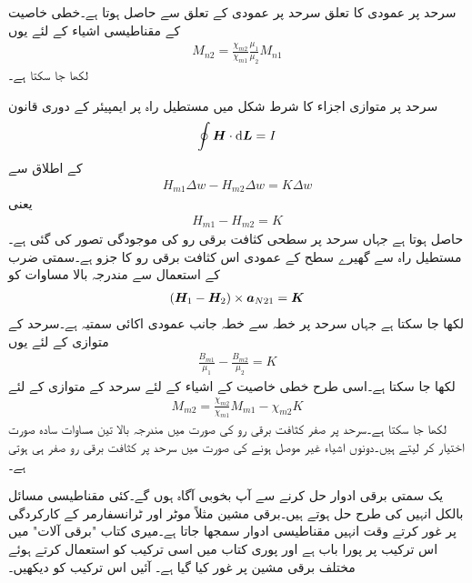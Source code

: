 سرحد پر عمودی  کا تعلق سرحد پر عمودی  کے تعلق سے حاصل ہوتا ہے۔خطی خاصیت کے مقناطیسی اشیاء کے لئے یوں
\begin{align}
M_{n2}=\frac{\chi_{m2}}{\chi_{m1}}\frac{\mu_1}{\mu_2}M_{n1}
\end{align}
لکھا جا سکتا ہے۔

سرحد پر متوازی اجزاء کا شرط شکل میں مستطیل راہ پر ایمپیئر کے دوری قانون
\begin{align*}
\oint \kvec{H} \cdot \dif \kvec{L}=I
\end{align*}
کے اطلاق سے
\begin{align*}
H_{m1} \Delta w -H_{m2}\Delta w=K \Delta w
\end{align*}
یعنی
\begin{align}
H_{m1} -H_{m2}=K
\end{align}
 حاصل ہوتا ہے جہاں سرحد پر سطحی کثافت برقی رو  کی موجودگی تصور کی گئی ہے۔مستطیل راہ سے گھیرے سطح کے عمودی اس کثافت برقی رو کا جزو  ہے۔سمتی ضرب کے استعمال سے مندرجہ بالا مساوات کو
\begin{align}
\left({{\boldsymbol{H}}}_1-{{\boldsymbol{H}}}_2 \right) \times {\ensuremath{{\boldsymbol{a}}}}_{N21} ={{\boldsymbol{K}}}
\end{align}
لکھا جا سکتا ہے جہاں  سرحد پر خطہ  سے خطہ  جانب عمودی اکائی سمتیہ  ہے۔سرحد کے متوازی  کے لئے یوں
\begin{align}
\frac{B_{m1}}{\mu_1}-\frac{B_{m2}}{\mu_2}=K
\end{align}
لکھا جا سکتا ہے۔اسی طرح خطی خاصیت کے اشیاء کے لئے سرحد کے متوازی  کے لئے
\begin{align}
M_{m2}=\frac{\chi_{m2}}{\chi_{m1}} M_{m1}-\chi_{m2} K
\end{align}
لکھا جا سکتا ہے۔سرحد پر صفر کثافت برقی رو کی صورت میں مندرجہ بالا تین مساوات سادہ صورت اختیار کر لیتے ہیں۔دونوں اشیاء غیر موصل ہونے کی صورت میں سرحد پر کثافت برقی رو صفر ہی ہوتی ہے۔

یک سمتی برقی ادوار حل کرنے سے آپ بخوبی آگاہ ہوں گے۔کئی مقناطیسی مسائل بالکل انہیں کی طرح حل ہوتے ہیں۔برقی مشین مثلاً موٹر اور ٹرانسفارمر کے کارکردگی پر غور کرتے وقت انہیں مقناطیسی ادوار سمجھا جاتا ہے۔میری کتاب "برقی آلات" میں اس ترکیب پر پورا باب ہے اور پوری کتاب میں اسی ترکیب کو استعمال کرتے ہوئے مختلف برقی مشین پر غور کیا گیا ہے۔ آئیں اس ترکیب کو دیکھیں۔

